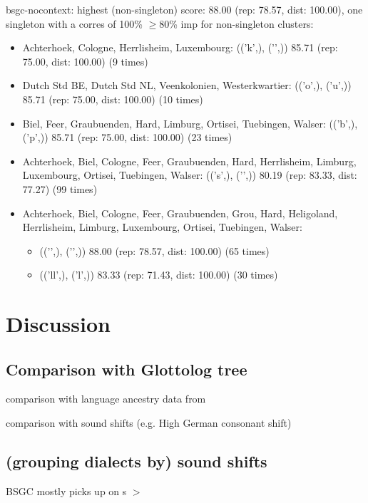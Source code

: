\documentclass{article}
\begin{document}
bsgc-nocontext: highest (non-singleton) score: 88.00  (rep: 78.57, dist: 100.00), one singleton with a corres of 100\%
$\geq$80\% imp for non-singleton clusters:
\begin{itemize}
\item Achterhoek, Cologne, Herrlisheim, Luxembourg:
(('k',), ('\textesh',)) 85.71 (rep: 75.00, dist: 100.00)  (9 times) 
\item Dutch Std BE, Dutch Std NL, Veenkolonien, Westerkwartier:
(('o\textlengthmark',), ('u',)) 85.71 (rep: 75.00, dist: 100.00)  (10 times)
\item Biel, Feer, Graubuenden, Hard, Limburg, Ortisei, Tuebingen, Walser:
(('b',), ('p',))  85.71 (rep: 75.00, dist: 100.00)  (23 times)
\item Achterhoek, Biel, Cologne, Feer, Graubuenden, Hard, Herrlisheim, Limburg, Luxembourg, Ortisei, Tuebingen, Walser:
(('s',), ('\textesh',)) 80.19 (rep: 83.33, dist: 77.27) (99 times)
\item Achterhoek, Biel, Cologne, Feer, Graubuenden, Grou, Hard, Heligoland, Herrlisheim, Limburg, Luxembourg, Ortisei, Tuebingen, Walser:
\begin{itemize}
\item (('\textg',), ('\textg',))  88.00 (rep: 78.57, dist: 100.00)  (65 times)
\item (('ll',), ('l',)) 83.33 (rep: 71.43, dist: 100.00)  (30 times)
\end{itemize}
\end{itemize}

\section{Discussion}


\subsection{Comparison with Glottolog tree}
comparison with language ancestry data from \citet{hammarstrom2018glottolog}

comparison with sound shifts (e.g. High German consonant shift)

\subsection{(grouping dialects by) sound shifts}

BSGC mostly picks up on s $>$ \textesh
\end{document}
